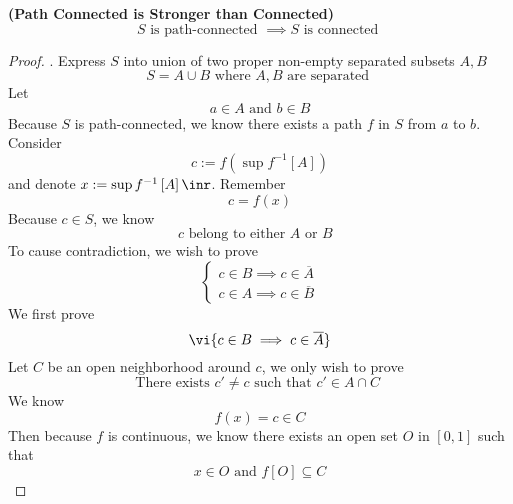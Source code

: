 \documentclass{report}
\begin{document}
\begin{theorem}
\label{2.3.7}
\textbf{(Path Connected is Stronger than Connected)} 
\begin{equation*}
S\text{ is path-connected }\implies S\text{ is connected }
\end{equation*}
\end{theorem}
\begin{proof}
. Express $S$ into union of two proper non-empty separated subsets $A,B$
\begin{equation*}
S=A\cup B\text{ where $A,B$ are separated }
\end{equation*}
Let 
\begin{equation*}
a\in A\text{ and }b\in B
\end{equation*}
Because $S$ is path-connected, we know there exists a path $f$ in  $S$ from  $a$ to $b$. Consider
\begin{equation*}
c :=f\left(\sup f^{-1}\left[A \right] \right)
\end{equation*}
and denote $x:=\sup f^{-1}\left[A \right]\inr$. Remember
\begin{equation*}
c=f\left(x \right)
\end{equation*}
Because $c\in S$, we know
\begin{equation*}
c\text{ belong to either $A$ or  $B$ }
\end{equation*}
To cause contradiction, we wish to prove
\begin{equation*}
\begin{cases}
  c\in B\implies c\in \overline{A}\\
  c\in A\implies c\in \overline{B}
\end{cases}
\end{equation*}
We first prove 
\begin{equation*}
  \vi{c\in B\implies  c\in \overline{A}}
\end{equation*}
Let $C$ be an open neighborhood around  $c$, we only wish to prove 
\begin{equation*}
\text{ There exists $c'\neq c$ such that $c'\in A\cap C$ }
\end{equation*}
We know 
\begin{equation*}
f\left(x \right)=c\in C
\end{equation*}
Then because $f$ is continuous, we know there exists an open set $O$ in  $\left[0,1 \right]$ such that  
\begin{equation*}
x\in O\text{ and }f\left[O \right]\subseteq C
\end{equation*}

\end{proof}
\end{document}
